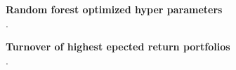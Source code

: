\documentclass{article}
\begin{document}
\begin{figure}[h]
\centering
\caption[Optimized random forest hyperparameters]{\textbf{Random forest optimized hyper parameters}\\ .}

\label{plot:RFHyperParams}
\end{figure}

\begin{figure}[h]
\centering
\caption[Turnover of highest epected return portfolios]{\textbf{Turnover of highest epected return portfolios}\\ .}

\label{plot:Turnover}
\end{figure}

\pagebreak


\end{document}
